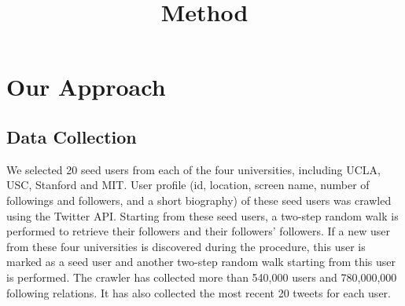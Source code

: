\documentclass{article}
\begin{document}
\title{Method}
\maketitle \else \fi

\section{Our Approach}\label{sec:method}



\subsection{Data Collection}
We selected 20 seed users from each of the four universities, including UCLA, USC, Stanford and MIT. User profile (id, location, screen name, number of followings and followers, and a short biography) of these seed users was crawled using the Twitter API. Starting from these seed users, a two-step random walk is performed to retrieve their followers and their followers' followers. If a new user from these four universities is discovered during the procedure, this user is marked as a seed user and another two-step random walk starting from this user is performed. The crawler has collected more than 540,000 users and 780,000,000 following relations. It has also collected the most recent 20 tweets for each user.
\end{document}
